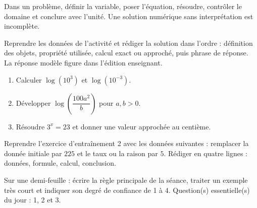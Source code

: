\begin{traceecrite}Dans un problème, définir la variable, poser l'équation, résoudre, contrôler le domaine et conclure avec l'unité. Une solution numérique sans interprétation est incomplète.\end{traceecrite}

\begin{exemple}
Reprendre les données de l'activité et rédiger la solution dans l'ordre : définition des objets, propriété utilisée, calcul exact ou approché, puis phrase de réponse. La réponse modèle figure dans l'édition enseignant.
\end{exemple}

\begin{exercice}[-- essentiel]
\begin{enumerate}\item Calculer $\log(10^3)$ et $\log(10^{-3})$.\item Développer $\log\!\left(\dfrac{100a^2}{b}\right)$ pour $a,b>0$.\item Résoudre $3^x=23$ et donner une valeur approchée au centième.\end{enumerate}
\end{exercice}


\begin{dm}Reprendre l'exercice d'entraînement 2 avec les données suivantes : remplacer la donnée initiale par $225$ et le taux ou la raison par $5$. Rédiger en quatre lignes : données, formule, calcul, conclusion.\end{dm}

\begin{sortie}Sur une demi-feuille : écrire la règle principale de la séance, traiter un exemple très court et indiquer son degré de confiance de 1 à 4. Question(s) essentielle(s) du jour : 1, 2 et 3.\end{sortie}

